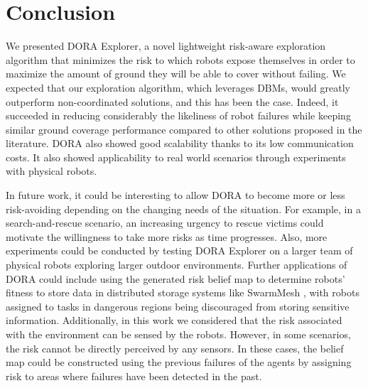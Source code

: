 \section{Conclusion}
We presented \ac{DORA} Explorer, a novel lightweight risk-aware exploration
algorithm that minimizes the risk to which robots expose themselves in
order to maximize the amount of ground they will be able to cover
without failing. We expected that our exploration algorithm, which
leverages \ac{DBM}s, would greatly outperform non-coordinated solutions,
and this has been the case. Indeed, it succeeded in reducing
considerably the likeliness of robot failures while keeping similar
ground coverage performance compared to other solutions proposed in
the literature. \ac{DORA} also showed good scalability thanks to its low
communication costs. It also showed applicability to real world
scenarios through experiments with physical robots.

In future work, it could be interesting to allow \ac{DORA} to become more
or less risk-avoiding depending on the changing needs of the
situation. For example, in a search-and-rescue scenario, an increasing
urgency to rescue victims could motivate the willingness to take more
risks as time progresses. Also, more experiments could be conducted by
testing \ac{DORA} Explorer on a larger team of physical robots exploring
larger outdoor environments. Further applications of \ac{DORA} could
include using the generated risk belief map to determine robots'
fitness to store data in distributed storage systems like SwarmMesh
\cite{majcherczykSwarmmesh2020}, with robots assigned to tasks in
dangerous regions being discouraged from storing sensitive
information. Additionally, in this work we considered that the risk
associated with the environment can be sensed by the robots. However,
in some scenarios, the risk cannot be directly perceived by any
sensors. In these cases, the belief map could be constructed using the
previous failures of the agents by assigning risk to areas where
failures have been detected in the past.
